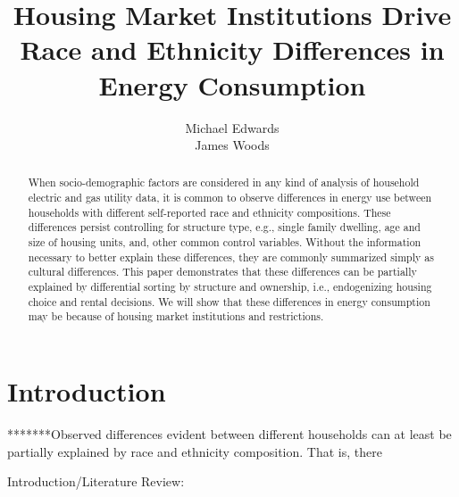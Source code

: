 \documentclass{article}
\author{Michael Edwards\\ 
  James Woods}
\title{Housing Market Institutions Drive Race and Ethnicity Differences in Energy Consumption}
\begin{document}
\maketitle


\begin{abstract}

When socio-demographic factors are considered in any kind of analysis of household electric and gas utility data, it is common to observe differences in energy use between households with different self-reported race and ethnicity compositions. These differences persist controlling for structure type, e.g., single family dwelling, age and size of housing units, and, other common control variables. Without the information necessary to better explain these differences, they are commonly summarized simply as cultural differences. This paper demonstrates that these differences can be partially explained by differential sorting by structure and ownership, i.e., endogenizing housing choice and rental decisions. We will show that these differences in energy consumption may be because of housing market institutions and restrictions.
\end{abstract}

\section{Introduction}

*******Observed differences evident between different households can at least be partially explained by race and ethnicity composition.  That is, there 

Introduction/Literature Review:
\end{document}
